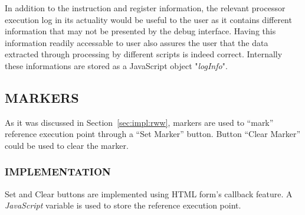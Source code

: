 In addition to the instruction and register information, the relevant processor execution log in its actuality would be useful to the user as it contains different information that may not be presented by the debug interface. Having this information readily accessable to user also assures the user that the data extracted through processing by different scripts is indeed correct. Internally these informations are stored as a JavaScript object "{\it logInfo}". 


\subsection{MARKERS}
As it was discussed in Section~\ref{sec:impl:rww}, markers are used to ``mark'' reference execution point through a ``Set Marker'' button. Button ``Clear Marker'' could  be used to clear the marker.

\subsubsection{IMPLEMENTATION}

Set and Clear buttons are implemented using HTML form's callback feature. A {\it JavaScript} variable is used to store the reference execution point.



